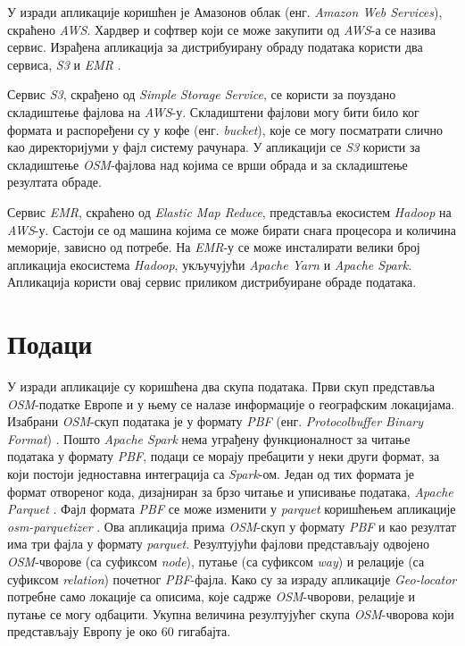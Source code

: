 \documentclass[12pt,oneside]{memoir}
\begin{document}
У изради апликације коришћен је Амазонов облак (енг. \textit{Amazon Web Services}), скраћено \textit{AWS}. Хардвер и софтвер који се може закупити од \textit{AWS}-а се назива сервис. Израђена апликација за дистрибуирану обраду података користи два сервиса, \textit{S3} \cite{s3} и \textit{EMR} \cite{emr}.


Сервис \textit{S3}, скрађено од \textit{Simple Storage Service}, се користи за поуздано складиштење фајлова на \textit{AWS}-у. Складиштени фајлови могу бити било ког формата и распоређени су у кофе (енг. \textit{bucket}), које се могу посматрати слично као директоријуми у фајл систему рачунара. У апликацији се \textit{S3} користи за складиштење \textit{OSM}-фајлова над којима се врши обрада и за складиштење резултата обраде.

Сервис \textit{EMR}, скраћено од \textit{Elastic Map Reduce}, представља екосистем \textit{Hadoop} на \textit{AWS}-у. Састоји се од машина којима се може бирати снага процесора и количина меморије, зависно од потребе. На \textit{EMR}-у се може инсталирати велики број апликација екосистема \textit{Hadoop}, укључујући \textit{Apache Yarn} и \textit{Apache Spark}. Апликација користи овај сервис приликом дистрибуиране обраде података.
 
\section{Подаци}
\label{sec:osm_spark_podaci}

У изради апликације су коришћена два скупа података. Први скуп представља \textit{OSM}-податке Европе и у њему се налазе информације о географским локацијама. Изабрани \textit{OSM}-скуп података је у формату \textit{PBF} (енг. \textit{Protocolbuffer Binary Format}) \cite{osm_pbf_format}. Пошто \textit{Apache Spark} нема уграђену функционалност за читање података у формату \textit{PBF}, подаци се морају пребацити у неки други формат, за који постоји једноставна интеграција са \textit{Spark}-ом. Један од тих формата је формат отвореног кода, дизајниран за брзо читање и уписивање података, \textit{Apache Parquet} \cite{apache_parquet}. Фајл формата \textit{PBF} се може изменити у \textit{parquet} коришћењем апликације \textit{osm-parquetizer} \cite{osm_parquetizer}. Ова апликација прима \textit{OSM}-скуп у формату \textit{PBF} и као резултат има три фајла у формату \textit{parquet}. Резултујући фајлови представљају одвојено  \textit{OSM}-чворове (са суфиксом \textit{node}), путање (са суфиксом \textit{way}) и релације (са суфиксом \textit{relation}) почетног \textit{PBF}-фајла. Како су за израду апликације \textit{Geo-locator} потребне само локације са описима, које садрже \textit{OSM}-чворови, релације и путање се могу одбацити. Укупна величина резултујућег скупа \textit{OSM}-чворова који представљају Европу је око 60 гигабајта.
\end{document}
